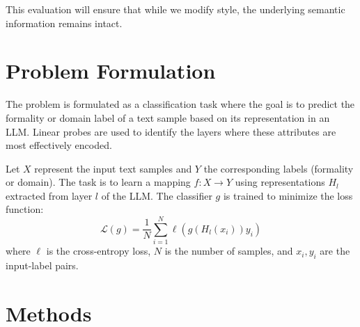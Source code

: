 \documentclass[twocolumn]{article}
\begin{document}
This evaluation will ensure that while we modify style, the underlying semantic information remains intact.

\section{Problem Formulation}

The problem is formulated as a classification task where the goal is to predict the formality or domain label of a text sample based on its representation in an LLM. Linear probes are used to identify the layers where these attributes are most effectively encoded.

Let $X$ represent the input text samples and $Y$ the corresponding labels (formality or domain). The task is to learn a mapping $f: X \to Y$ using representations $H_l$ extracted from layer $l$ of the LLM. The classifier $g$ is trained to minimize the loss function:
\begin{equation}
\mathcal{L}(g) = \frac{1}{N} \sum_{i=1}^N \ell(g(H_l(x_i)) y_i)
\end{equation}
where $\ell$ is the cross-entropy loss, $N$ is the number of samples, and $x_i, y_i$ are the input-label pairs.


\section{Methods}
\end{document}
